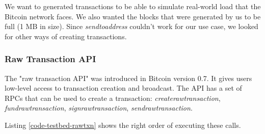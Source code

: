 
\newpage

We want to generated transactions to be able to simulate real-world load that the Bitcoin network faces. We also wanted the blocks that were generated by us to be full (1 MB in size).
Since \textit{sendtoaddress} couldn't work for our use case, we looked for other ways of creating transactions.

\subsubsection{Raw Transaction API} \label{impl-txns-raw}

The "raw transaction API" was introduced in Bitcoin version 0.7. It gives users low-level access to transaction creation and broadcast. The API has a set of RPCs that can be used to create a transaction: \textit{createrawtransaction}, \textit{fundrawtransaction}, \textit{signrawtransaction}, \textit{sendrawtransaction}. 

Listing \ref{code-testbed-rawtxn} shows the right order of executing these calls.



